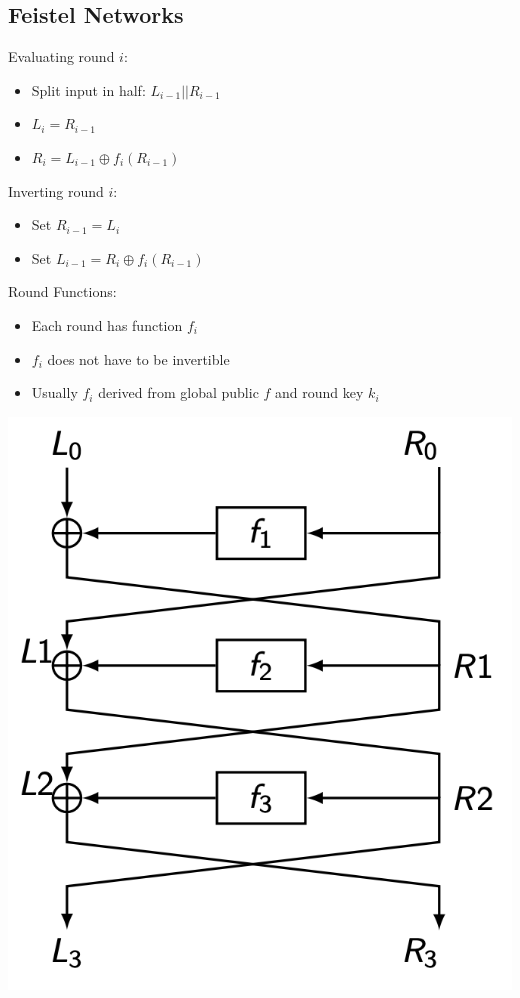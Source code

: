 \subsection*{Feistel Networks}
Evaluating round $i$:
\begin{itemize}
    \item Split input in half: $L_{i-1}||R_{i-1}$
    \item $L_i=R_{i-1}$
    \item $R_i=L_{i-1}\oplus f_i(R_{i-1})$
\end{itemize}
Inverting round $i$:
\begin{itemize}
    \item Set $R_{i-1}=L_{i}$
    \item Set $L_{i-1}=R_i\oplus f_i(R_{i-1})$
\end{itemize}
Round Functions:
\begin{itemize}
    \item Each round has function $f_i$
    \item $f_i$ does not have to be invertible
    \item Usually $f_i$ derived from global public $f$ and round key $k_i$
\end{itemize}
\includegraphics[width=\columnwidth]{Feistel.png}

